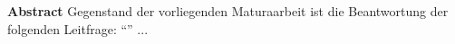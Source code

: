 \textbf{Abstract}
Gegenstand der vorliegenden Maturaarbeit ist die Beantwortung der folgenden Leitfrage: \enquote{\maFRAGE} ...
